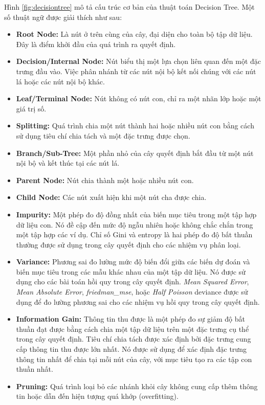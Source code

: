 \documentclass[a4paper]{article}
\begin{document}
Hình \ref{fig:decisiontree} mô tả cấu trúc cơ bản của thuật toán Decision Tree. Một số thuật ngữ được giải thích như sau\cite{geeksforgeeks_decision_tree}:
\begin{itemize}
    \item \textbf{Root Node:} Là nút ở trên cùng của cây, đại diện cho toàn bộ tập dữ liệu. Đây là điểm khởi đầu của quá trình ra quyết định.
    \item \textbf{Decision/Internal Node: }Nút biểu thị một lựa chọn liên quan đến một đặc trưng đầu vào. Việc phân nhánh từ các nút nội bộ kết nối chúng với các nút lá hoặc các nút nội bộ khác.
    \item \textbf{Leaf/Terminal Node:} Nút không có nút con, chỉ ra một nhãn lớp hoặc một giá trị số.
    \item \textbf{Splitting:} Quá trình chia một nút thành hai hoặc nhiều nút con bằng cách sử dụng tiêu chí chia tách và một đặc trưng được chọn.
    \item \textbf{Branch/Sub-Tree:} Một phần nhỏ của cây quyết định bắt đầu từ một nút nội bộ và kết thúc tại các nút lá.
    \item \textbf{Parent Node:} Nút chia thành một hoặc nhiều nút con.
    \item \textbf{Child Node:} Các nút xuất hiện khi một nút cha được chia.
    \item \textbf{Impurity:} Một phép đo độ đồng nhất của biến mục tiêu trong một tập hợp dữ liệu con. Nó đề cập đến mức độ ngẫu nhiên hoặc không chắc chắn trong một tập hợp các ví dụ. Chỉ số Gini và entropy là hai phép đo độ bất thuần thường được sử dụng trong cây quyết định cho các nhiệm vụ phân loại.
    \item \textbf{Variance:} Phương sai đo lường mức độ biến đổi giữa các biến dự đoán và biến mục tiêu trong các mẫu khác nhau của một tập dữ liệu. Nó được sử dụng cho các bài toán hồi quy trong cây quyết định. \textit{Mean Squared Error}, \textit{Mean Absolute Error}, \textit{friedman\_mse}, hoặc \textit{Half Poisson} deviance được sử dụng để đo lường phương sai cho các nhiệm vụ hồi quy trong cây quyết định.
    \item \textbf{Information Gain:} Thông tin thu được là một phép đo sự giảm độ bất thuần đạt được bằng cách chia một tập dữ liệu trên một đặc trưng cụ thể trong cây quyết định. Tiêu chí chia tách được xác định bởi đặc trưng cung cấp thông tin thu được lớn nhất. Nó được sử dụng để xác định đặc trưng thông tin nhất để chia tại mỗi nút của cây, với mục tiêu tạo ra các tập con thuần nhất.
    \item \textbf{Pruning:} Quá trình loại bỏ các nhánh khỏi cây không cung cấp thêm thông tin hoặc dẫn đến hiện tượng quá khớp (overfitting).
\end{itemize}
\end{document}
